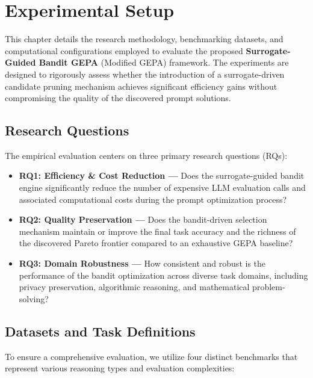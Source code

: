 \chapter{Experimental Setup}

This chapter details the research methodology, benchmarking datasets, and computational configurations employed to evaluate the proposed \textbf{Surrogate-Guided Bandit GEPA} (Modified GEPA) framework. The experiments are designed to rigorously assess whether the introduction of a surrogate-driven candidate pruning mechanism achieves significant efficiency gains without compromising the quality of the discovered prompt solutions.

\section{Research Questions}

The empirical evaluation centers on three primary research questions (RQs):

\begin{itemize}
    \item \textbf{RQ1: Efficiency \& Cost Reduction —} Does the surrogate-guided bandit engine significantly reduce the number of expensive LLM evaluation calls and associated computational costs during the prompt optimization process?
    \item \textbf{RQ2: Quality Preservation —} Does the bandit-driven selection mechanism maintain or improve the final task accuracy and the richness of the discovered Pareto frontier compared to an exhaustive GEPA baseline?
    \item \textbf{RQ3: Domain Robustness —} How consistent and robust is the performance of the bandit optimization across diverse task domains, including privacy preservation, algorithmic reasoning, and mathematical problem-solving?
\end{itemize}

\section{Datasets and Task Definitions}

To ensure a comprehensive evaluation, we utilize four distinct benchmarks that represent various reasoning types and evaluation complexities:


